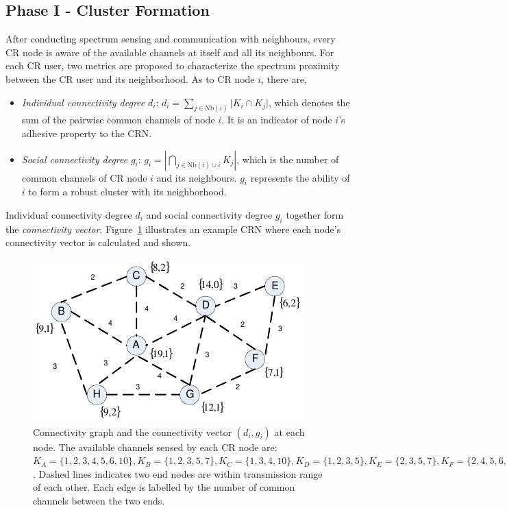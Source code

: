 \documentclass[10pt,journal,compsoc]{IEEEtran}
\theoremstyle{mytheoremstyle}
\theoremstyle{mytheoremstyle}
\theoremstyle{mytheoremstyle}
\begin{document}
\subsection{Phase I - Cluster Formation}
\label{phaseI}
After conducting spectrum sensing and communication with neighbours, every CR node is aware of the available channels at itself and all its neighbours.
For each CR user, two metrics are proposed to characterize the spectrum proximity between the CR user and its neighborhood.
As to CR node $i$, there are,
\begin{itemize}

\item \textit{Individual connectivity degree} $d_i$: $d_i=\sum_{j\in \text{Nb}(i)}\vert K_i\cap K_j\vert$, which denotes the sum of the pairwise common channels of node $i$. 
It is an indicator of node $i$'s adhesive property to the CRN. 

\item \textit{Social connectivity degree} $g_i$: $g_i=|\bigcap_{j\in \text{Nb}(i)\cup i}K_j|$, which is the number of common channels of CR node $i$ and its neighbours.
$g_i$ represents the ability of $i$ to form a robust cluster with its neighborhood.
\end{itemize}
Individual connectivity degree $d_i$ and social connectivity degree $g_i$ together form the \textit{connectivity vector}.
Figure~\ref{fig1} illustrates an example CRN where each node's connectivity vector is calculated and shown.	
\begin{figure}[ht!]
  \centering
\includegraphics[width=0.7\linewidth]{figure1.pdf}
	\caption{Connectivity graph and the connectivity vector $(d_i, g_i)$ at each node. The available channels sensed by each CR node are: $K_A=\{1,2,3,4,5,6,10\}, K_B=\{1,2,3,5,7\}, K_C=\{1,3,4,10\}, K_D=\{1,2,3,5\}, K_E=\{2,3,5,7\}, K_F=\{2,4,5,6,7\}, K_G=\{1,2,3,4,8\}, K_H=\{1,2,5,8\}$. Dashed lines indicates two end nodes are within transmission range of each other. Each edge is labelled by the number of common channels between the two ends.}
	\label{fig1}
\end{figure}
\end{document}
